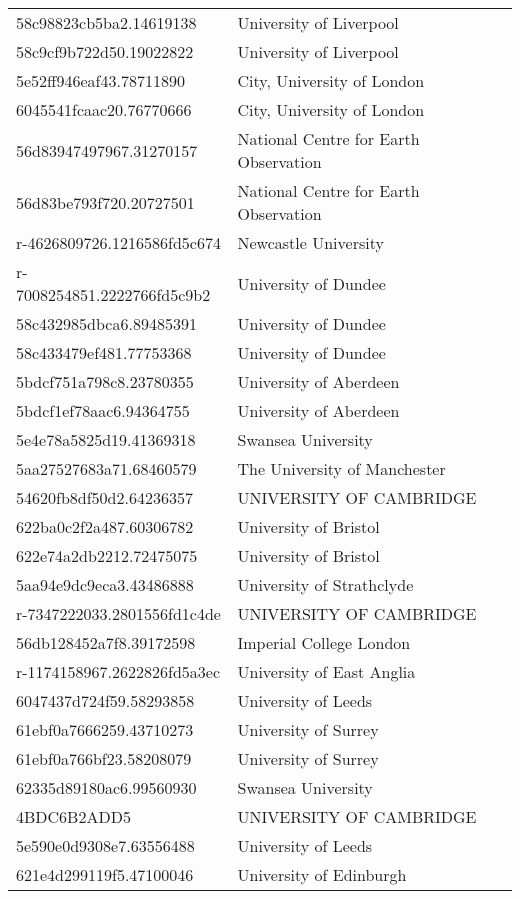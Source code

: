 \begin{tabular}{ll}
58c98823cb5ba2.14619138 & University of Liverpool \\
58c9cf9b722d50.19022822 & University of Liverpool \\
5e52ff946eaf43.78711890 & City, University of London \\
6045541fcaac20.76770666 & City, University of London \\
56d83947497967.31270157 & National Centre for Earth Observation \\
56d83be793f720.20727501 & National Centre for Earth Observation \\
r-4626809726.1216586fd5c674 & Newcastle University \\
r-7008254851.2222766fd5c9b2 & University of Dundee \\
58c432985dbca6.89485391 & University of Dundee \\
58c433479ef481.77753368 & University of Dundee \\
5bdcf751a798c8.23780355 & University of Aberdeen \\
5bdcf1ef78aac6.94364755 & University of Aberdeen \\
5e4e78a5825d19.41369318 & Swansea University \\
5aa27527683a71.68460579 & The University of Manchester \\
54620fb8df50d2.64236357 & UNIVERSITY OF CAMBRIDGE \\
622ba0c2f2a487.60306782 & University of Bristol \\
622e74a2db2212.72475075 & University of Bristol \\
5aa94e9dc9eca3.43486888 & University of Strathclyde \\
r-7347222033.2801556fd1c4de & UNIVERSITY OF CAMBRIDGE \\
56db128452a7f8.39172598 & Imperial College London \\
r-1174158967.2622826fd5a3ec & University of East Anglia \\
6047437d724f59.58293858 & University of Leeds \\
61ebf0a7666259.43710273 & University of Surrey \\
61ebf0a766bf23.58208079 & University of Surrey \\
62335d89180ac6.99560930 & Swansea University \\
4BDC6B2ADD5 & UNIVERSITY OF CAMBRIDGE \\
5e590e0d9308e7.63556488 & University of Leeds \\
621e4d299119f5.47100046 & University of Edinburgh \\

\end{tabular}
